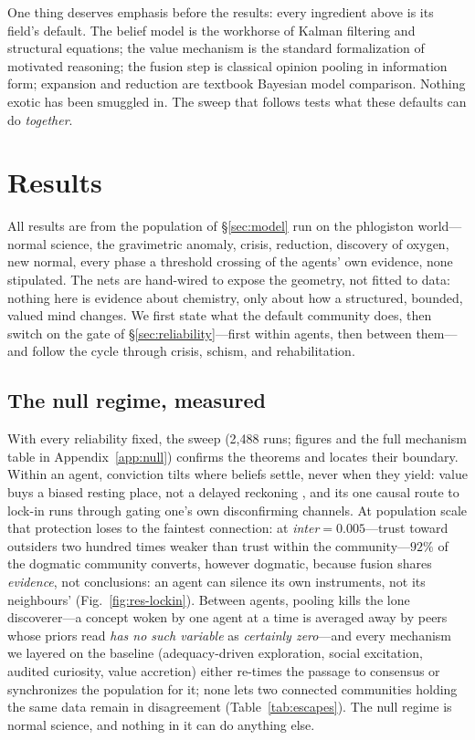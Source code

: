 \documentclass[runningheads]{llncs}
\begin{document}
One thing deserves emphasis before the results: every ingredient above is its field's default.
The belief model is the workhorse of Kalman filtering and structural equations; the value
mechanism is the standard formalization of motivated reasoning; the fusion step is classical
opinion pooling in information form; expansion and reduction are textbook Bayesian model
comparison. Nothing exotic has been smuggled in. The sweep that follows tests what these
defaults can do \emph{together}.

\section{Results}
\label{sec:results}

All results are from the population of \S\ref{sec:model} run on the phlogiston world---normal
science, the gravimetric anomaly, crisis, reduction, discovery of oxygen, new normal, every phase
a threshold crossing of the agents' own evidence, none stipulated. The nets are hand-wired to
expose the geometry, not fitted to data: nothing here is evidence about chemistry, only about how
a structured, bounded, valued mind changes. We first state what the default community does, then
switch on the gate of \S\ref{sec:reliability}---first within agents, then between them---and
follow the cycle through crisis, schism, and rehabilitation.

\subsection{The null regime, measured}
\label{sec:res-null}

With every reliability fixed, the sweep (2{,}488 runs; figures and the full mechanism table in
Appendix~\ref{app:null}) confirms the theorems and locates their boundary. Within an agent,
conviction tilts where beliefs settle, never when they yield: value buys a biased resting place,
not a delayed reckoning \citep{hyland2025}, and its one causal route to lock-in runs through
gating one's own disconfirming channels. At population scale that protection loses to the
faintest connection: at \emph{inter}$=0.005$---trust toward outsiders two hundred times weaker
than trust within the community---$92\%$ of the dogmatic community converts, however dogmatic,
because fusion shares \emph{evidence}, not conclusions: an agent can silence its own instruments,
not its neighbours' (Fig.~\ref{fig:res-lockin}). Between agents, pooling kills the lone
discoverer---a concept woken by one agent at a time is averaged away by peers whose priors read
\emph{has no such variable} as \emph{certainly zero}---and every mechanism we layered on the
baseline (adequacy-driven exploration, social excitation, audited curiosity, value accretion)
either re-times the passage to consensus or synchronizes the population for it; none lets two
connected communities holding the same data remain in disagreement
(Table~\ref{tab:escapes}). The null regime is normal science, and nothing in it can do anything
else.
\end{document}
